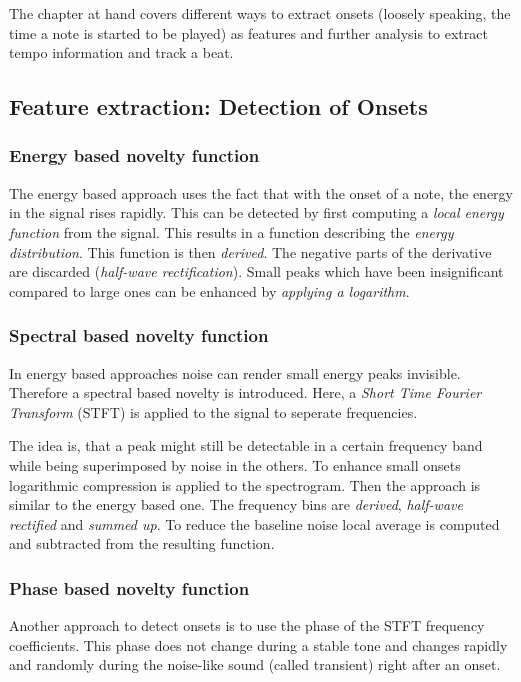\documentclass[a4paper, 9pt, twocolumn]{extarticle}
\begin{document}
The chapter at hand covers different ways to extract
onsets (loosely speaking, the time a note is started to be played) as features and
further analysis to extract tempo information and track a beat.

\subsection{Feature extraction: Detection of Onsets}
\label{novelty_functions}
\subsubsection{Energy based novelty function}
The energy based approach uses the fact that with the onset of a note, the energy in the
signal rises rapidly. This can be detected by first computing a \emph{local energy function} from
the signal. This results in a function describing the \emph{energy distribution}. This function
is then \emph{derived}. The negative parts of the derivative are discarded
(\emph{half-wave rectification}). Small peaks which have been insignificant compared to large
ones can be enhanced by \emph{applying a logarithm}.

\subsubsection{Spectral based novelty function}
In energy based approaches noise can render small energy peaks invisible. Therefore
a spectral based novelty is introduced. Here, a \emph{Short Time Fourier Transform} (STFT) is
applied to the signal to seperate frequencies.

The idea is, that a peak might still be
detectable in a certain frequency band while being superimposed by noise in the others.
To enhance small onsets logarithmic compression is applied to the spectrogram. Then the approach
is similar to the energy based one. The frequency bins are \emph{derived}, \emph{half-wave
rectified} and \emph{summed up}. To reduce the baseline noise local average is computed and
subtracted from the resulting function.

\subsubsection{Phase based novelty function}
Another approach to detect onsets is to use the phase of the STFT frequency coefficients.
This phase does not change during a stable tone and changes rapidly and randomly during
the noise-like sound (called transient) right after an onset.
\end{document}

